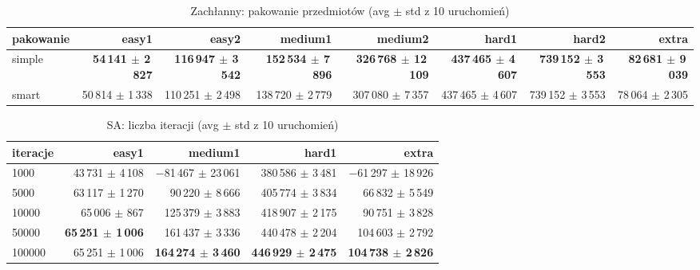 \begin{table}[H]
  \centering
  \small
  \caption{Zachłanny: pakowanie przedmiotów (avg $\pm$ std z 10 uruchomień)}
  \label{tab:greedy-packing}
  \begin{tabular}{lrrrrrrr}
    \toprule
    pakowanie & easy1 & easy2 & medium1 & medium2 & hard1 & hard2 & extra \\
    \midrule
    simple & \textbf{54\,141 $\pm$ 2\,827} & \textbf{116\,947 $\pm$ 3\,542} & \textbf{152\,534 $\pm$ 7\,896} & \textbf{326\,768 $\pm$ 12\,109} & \textbf{437\,465 $\pm$ 4\,607} & \textbf{739\,152 $\pm$ 3\,553} & \textbf{82\,681 $\pm$ 9\,039} \\
    smart & 50\,814 $\pm$ 1\,338 & 110\,251 $\pm$ 2\,498 & 138\,720 $\pm$ 2\,779 & 307\,080 $\pm$ 7\,357 & 437\,465 $\pm$ 4\,607 & 739\,152 $\pm$ 3\,553 & 78\,064 $\pm$ 2\,305 \\
    \bottomrule
  \end{tabular}
\end{table}

\begin{table}[H]
  \centering
  \small
  \caption{SA: liczba iteracji (avg $\pm$ std z 10 uruchomień)}
  \label{tab:sa-iter}
  \begin{tabular}{lrrrr}
    \toprule
    iteracje & easy1 & medium1 & hard1 & extra \\
    \midrule
    1000 & 43\,731 $\pm$ 4\,108 & $-$81\,467 $\pm$ 23\,061 & 380\,586 $\pm$ 3\,481 & $-$61\,297 $\pm$ 18\,926 \\
    5000 & 63\,117 $\pm$ 1\,270 & 90\,220 $\pm$ 8\,666 & 405\,774 $\pm$ 3\,834 & 66\,832 $\pm$ 5\,549 \\
    10000 & 65\,006 $\pm$ 867 & 125\,379 $\pm$ 3\,883 & 418\,907 $\pm$ 2\,175 & 90\,751 $\pm$ 3\,828 \\
    50000 & \textbf{65\,251 $\pm$ 1\,006} & 161\,437 $\pm$ 3\,336 & 440\,478 $\pm$ 2\,204 & 104\,603 $\pm$ 2\,792 \\
    100000 & 65\,251 $\pm$ 1\,006 & \textbf{164\,274 $\pm$ 3\,460} & \textbf{446\,929 $\pm$ 2\,475} & \textbf{104\,738 $\pm$ 2\,826} \\
    \bottomrule
  \end{tabular}
\end{table}

